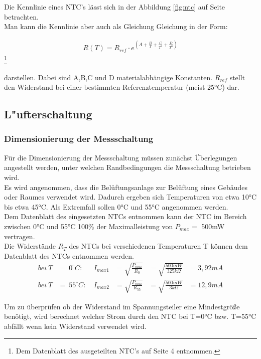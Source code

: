 Die Kennlinie eines NTC's lässt sich in der Abbildung \ref{fig:ntc} auf Seite \pageref{fig:ntc} betrachten.\\
Man kann die Kennlinie aber auch als Gleichung Gleichung in der Form: 

\begin{align}
R(T) = R_{ref}\cdot e^{(A+\frac{B}{T} + \frac{C}{T^2} + \frac{D}{T^3})}
\end{align}
\footnote{Dem Datenblatt des ausgeteilten NTC's auf Seite 4 entnommen.}

darstellen. Dabei sind A,B,C und D materialabhängige Konstanten. \(R_{ref}\) stellt den Widerstand bei einer bestimmten Referenztemperatur (meist 25°C) dar.


\subsection{L"ufterschaltung}

\subsubsection{Dimensionierung der Messschaltung}

Für die Dimensionierung der Messschaltung müssen zunächst Überlegungen angestellt werden, unter welchen Randbedingungen die Messschaltung betrieben wird.\\
Es wird angenommen, dass die Belüftungsanlage zur Belüftung eines Gebäudes oder Raumes verwendet wird. Dadurch ergeben sich Temperaturen von etwa 10°C bis etwa 45°C. Als Extremfall sollen 0°C und 55°C angenommen werden.\\
Dem Datenblatt des eingesetzten NTCs entnommen kann der NTC im Bereich zwischen 0°C und 55°C 100\% der Maximalleistung von \(P_{max} =\) 500mW vertragen.\\
Die Widerstände \(R_T\) des NTCs bei verschiedenen Temperaturen T können dem Datenblatt des NTCs entnommen werden.
\begin{align}
bei\ T&=\ 0^{\circ} C:\ &I_{max1} &= \sqrt{\frac{P_{max}}{R_0}} &= \sqrt{\frac{500mW}{325k\Omega}} &= 3,92mA\\
bei\ T&=\ 55^{\circ} C:\ &I_{max2} &= \sqrt{\frac{P_{max}}{R_{55}}} &= \sqrt{\frac{500mW}{3k\Omega}} &= 12,9mA 
\end{align}

Um zu überprüfen ob der Widerstand im Spannungsteiler eine Mindestgröße benötigt, wird berechnet welcher Strom durch den NTC bei T=0°C bzw. T=55°C abfällt wenn kein Widerstand verwendet wird.\\

